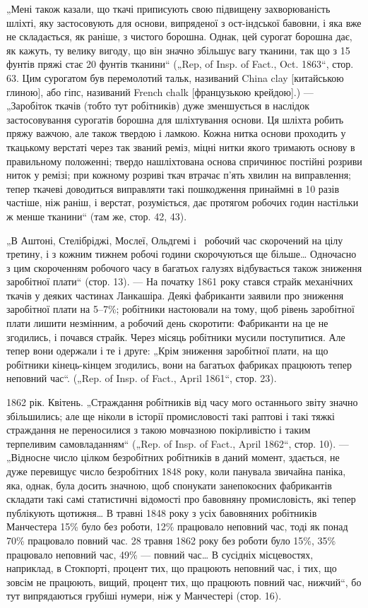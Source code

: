 „Мені також казали, що ткачі приписують свою підвищену
захворюваність шліхті, яку застосовують для основи, випряденої
з ост-індської бавовни, і яка вже не складається, як раніше,
з чистого борошна. Однак, цей сурогат борошна дає, як кажуть,
ту велику вигоду, що він значно збільшує вагу тканини, так
що з 15 фунтів пряжі стає 20 фунтів тканини“ („Rep, of Insp.
of Fact., Oct. 1863“, стор. 63. Цим сурогатом був перемолотий
тальк, називаний China clay [китайською глиною], або гіпс, називаний
French chalk [французькою крейдою].) — „Заробіток ткачів
(тобто тут робітників) дуже зменшується в наслідок застосовування
сурогатів борошна для шліхтування основи. Ця шліхта
робить пряжу важчою, але також твердою і ламкою. Кожна
нитка основи проходить у ткацькому верстаті через так званий
реміз, міцні нитки якого тримають основу в правильному положенні;
твердо нашліхтована основа спричинює постійні розриви
ниток у ремізі; при кожному розриві ткач втрачає п’ять хвилин
на виправлення; тепер ткачеві доводиться виправляти такі
пошкодження принаймні в 10 разів частіше, ніж раніш, і верстат,
розуміється, дає протягом робочих годин настільки ж менше
тканини“ (там же, стор. 42, 43).

„В Аштоні, Стелібріджі, Мослеї, Ольдгемі і~ робочий
час скорочений на цілу третину, і з кожним тижнем робочі години
скорочуються ще більше\dots{} Одночасно з цим скороченням
робочого часу в багатьох галузях відбувається також зниження
заробітної плати“ (стор. 13). — На початку 1861 року стався
страйк механічних ткачів у деяких частинах Ланкашіра. Деякі
фабриканти заявили про зниження заробітної плати на 5--7\%;
робітники настоювали на тому, щоб рівень заробітної плати лишити
незмінним, а робочий день скоротити: Фабриканти на це не
згодились, і почався страйк. Через місяць робітники мусили поступитися.
Але тепер вони одержали і те і друге: „Крім зниження
заробітної плати, на що робітники кінець-кінцем згодились,
вони на багатьох фабриках працюють тепер неповний час“.
(„Rep. of Insp. of Fact., April 1861“, стор. 23).

1862 рік. Квітень. „Страждання робітників від часу мого
останнього звіту значно збільшились; але ще ніколи в історії
промисловості такі раптові і такі тяжкі страждання не переносилися
з такою мовчазною покірливістю і таким терпеливим
самовладанням“ („Rep. of Insp. of Fact., April 1862“, стор. 10). —
„Відносне число цілком безробітних робітників в даний момент,
здається, не дуже перевищує число безробітних 1848 року,
коли панувала звичайна паніка, яка, однак, була досить значною,
щоб спонукати занепокоєних фабрикантів складати такі
самі статистичні відомості про бавовняну промисловість, які
тепер публікують щотижня\dots{} В травні 1848 року з усіх бавовняних
робітників Манчестера 15\% було без роботи, 12\% працювало
неповний час, тоді як понад 70\% працювало повний час. 28 травня
1862 року без роботи було 15\%, 35\% працювало неповний час,
49\% — повний час\dots{} В сусідніх місцевостях, наприклад, в Стокпорті,
процент тих, що працюють неповний час, і тих, що зовсім
не працюють, вищий, процент тих, що працюють повний час,
нижчий“, бо тут випрядаються грубіші нумери, ніж у Манчестері
(стор. 16).


